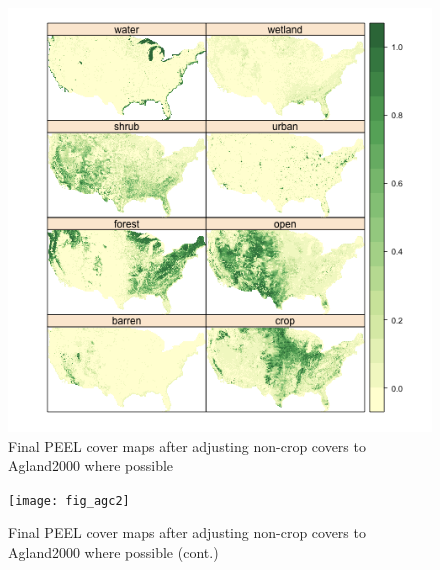 \begin{figure}[hpt] 
  \centering


\includegraphics{fig_agc}
\caption{Final PEEL cover maps after adjusting non-crop covers to Agland2000 where possible} 
\label{fig:agc} 
\end{figure} 

\begin{figure}[hpt] 
  \centering


\texttt{[image: fig\_agc2]}
\caption{Final PEEL cover maps after adjusting non-crop covers to Agland2000 where possible (cont.)} 
\label{fig:agc2} 
\end{figure} 




